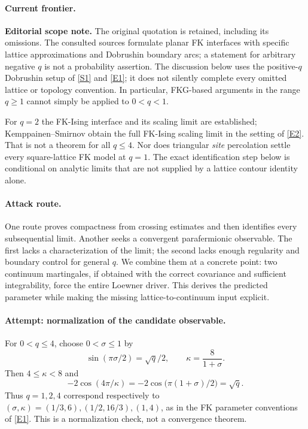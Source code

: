 \documentclass[11pt,a4paper]{article}
\newcommand{\sref}[2]{\hyperlink{source:#1:#2}{[S#2]}}
\newcommand{\eref}[2]{\hyperlink{extra:#1:#2}{[E#2]}}
\numberwithin{equation}{section}
\begin{document}
\paragraph{Current frontier.}
\textbf{Editorial scope note.} The original quotation is retained, including
its omissions. The consulted sources formulate planar FK interfaces with
specific lattice approximations and Dobrushin boundary arcs; a statement
for arbitrary negative $q$ is not a probability assertion. The discussion
below uses the positive-$q$ Dobrushin setup of \sref{30006768}{1} and
\eref{30006768}{1}; it does not silently complete every omitted lattice or
topology convention. In particular, FKG-based arguments in the range
$q\ge1$ cannot simply be applied to $0<q<1$.

For $q=2$ the FK-Ising interface and its scaling limit are established;
Kemppainen--Smirnov obtain the full FK-Ising scaling limit in the setting of
\eref{30006768}{2}. That is not a theorem for all $q\le4$. Nor does triangular
\emph{site} percolation settle every square-lattice FK model at $q=1$.
The exact identification step below is conditional on analytic limits that
are not supplied by a lattice contour identity alone.

\paragraph{Attack route.}
One route proves compactness from crossing estimates and then identifies
every subsequential limit. Another seeks a convergent parafermionic
observable. The first lacks a characterization of the limit; the second
lacks enough regularity and boundary control for general $q$. We combine
them at a concrete point: two continuum martingales, if obtained with the
correct covariance and sufficient integrability, force the entire Loewner
driver. This derives the predicted parameter while making the missing
lattice-to-continuum input explicit.

\paragraph{Attempt: normalization of the candidate observable.}
For $0<q\le4$, choose $0<\sigma\le1$ by
\[
 \sin(\pi\sigma/2)=\sqrt q/2,
 \qquad \kappa=\frac8{1+\sigma}.
\]
Then $4\le\kappa<8$ and
\[
 -2\cos(4\pi/\kappa)
   =-2\cos\bigl(\pi(1+\sigma)/2\bigr)=\sqrt q.
\]
Thus $q=1,2,4$ correspond respectively to
$(\sigma,\kappa)=(1/3,6),(1/2,16/3),(1,4)$, as in the FK parameter
conventions of \eref{30006768}{1}. This is a normalization check, not a
convergence theorem.
\end{document}
